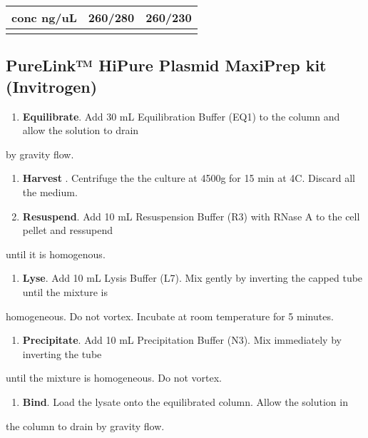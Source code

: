 \documentclass[11pt]{article}
\begin{document}
\begin{center}
\begin{tabular}{lll}
\hline
conc ng/uL & 260/280 & 260/230\\
\hline
 &  & \\
\hline
\end{tabular}
\end{center}

\subsection{PureLink™ HiPure Plasmid MaxiPrep kit (Invitrogen)}
\label{sec:org071bde7}
\begin{enumerate}
\item \textbf{Equilibrate}. Add 30 mL Equilibration Buffer (EQ1) to the column and allow the solution to drain\\
\end{enumerate}
by gravity flow.\\

\begin{enumerate}
\item \textbf{Harvest} . Centrifuge the the culture at 4500g for 15 min at 4C. Discard all the medium.\\

\item \textbf{Resuspend}. Add 10 mL Resuspension Buffer (R3) with RNase A to the cell pellet and ressupend\\
\end{enumerate}
until it is homogenous.\\

\begin{enumerate}
\item \textbf{Lyse}. Add 10 mL Lysis Buffer (L7). Mix gently by inverting the capped tube until the mixture is\\
\end{enumerate}
homogeneous. Do not vortex. Incubate at room temperature for 5 minutes.\\

\begin{enumerate}
\item \textbf{Precipitate}. Add 10 mL Precipitation Buffer (N3). Mix immediately by inverting the tube\\
\end{enumerate}
until the mixture is homogeneous. Do not vortex.\\

\begin{enumerate}
\item \textbf{Bind}. Load the lysate onto the equilibrated column. Allow the solution in\\
\end{enumerate}
the column to drain by gravity flow.\\
\end{document}
